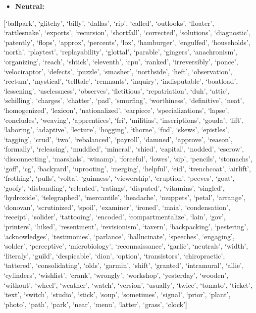 \documentclass[
  12pt,
  dvipsnames,enabledeprecatedfontcommands]{scrartcl}
\providecommand{\tightlist}{%
  \setlength{\itemsep}{0pt}\setlength{\parskip}{0pt}}
\begin{document}
\begin{itemize}
\tightlist
\item
  \textbf{Neutral:}
\end{itemize}

{[}`ballpark', `glitchy', `billy', `dallas', `rip', `called',
`outlooks', `floater', `rattlesnake', `exports', `recursion',
`shortfall', `corrected', `solutions', `diagnostic', `patently',
`flops', `approx', `percents', `lox', `hamburger', `engulfed',
`households', `north', `playtest', `replayability', `glottal',
`parable', `gingers', `anachronism', `organizing', `reach', `shtick',
`eleventh', `cpu', `ranked', `irreversibly', `ponce', `velociraptor',
`defects', `puzzle', `smasher', `northside', `heft', `observation',
`rectum', `mystical', `telltale', `remnants', `inquiry', `indisputable',
`boatload', `lessening', `uselessness', `observes', `fictitious',
`repatriation', `duh', `attic', `schilling', `charges', `chatter',
`pad', `smurfing', `worthiness', `definitive', `neat', `homogenized',
`lexicon', `nationalized', `earpiece', `specializations', `lapse',
`concludes', `weaving', `apprentices', `fri', `militias',
`inscriptions', `gouda', `lift', `laboring', `adaptive', `lecture',
`hogging', `thorne', `fud', `skews', `epistles', `tagging', `crud',
`two', `rebalanced', `payroll', `damned', `approve', `reason',
`formally', `releasing', `muddled', `mineral', `shied', `capital',
`nodded', `escrow', `disconnecting', `marshals', `winamp', `forceful',
`lowes', `sip', `pencils', `stomachs', `goff', `cg', `backyard',
`uprooting', `merging', `helpful', `eid', `trenchcoat', `airlift',
`frothing', `pulls', `volta', `guinness', `viewership', `eruption',
`peeves', `goat', `goofy', `disbanding', `relented', `ratings',
`disputed', `vitamins', `singled', `hydroxide', `telegraphed',
`mercantile', `headache', `muppets', `petal', `arrange', `donovan',
`scrutinized', `spoil', `examiner', `ironed', `maia', `condensation',
`receipt', `solider', `tattooing', `encoded', `compartmentalize',
`lain', `gov', `printers', `hiked', `resentment', `revisionism',
`tavern', `backpacking', `pestering', `acknowledges', `testimonies',
`parlance', `hallucinate', `speeches', `engaging', `solder',
`perceptive', `microbiology', `reconnaissance', `garlic', `neutrals',
`width', `literaly', `guild', `despicable', `dion', `option',
`transistors', `chiropractic', `tattered', `consolidating', `olds',
`garmin', `shift', `granted', `intramural', `allie', `cylinders',
`wishlist', `crank', `wrongly', `workshop', `yesterday', `wooden',
`without', `wheel', `weather', `watch', `version', `usually', `twice',
`tomato', `ticket', `text', `switch', `studio', `stick', `soup',
`sometimes', `signal', `prior', `plant', `photo', `path', `park',
`near', `menu', `latter', `grass', `clock'{]}
\end{document}

